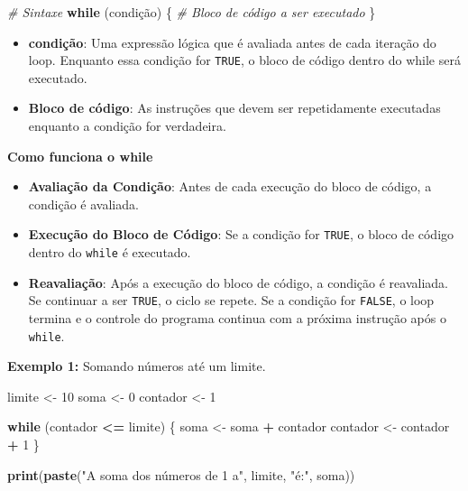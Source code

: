 \documentclass[
]{book}
\newenvironment{Shaded}{\begin{snugshade}}{\end{snugshade}}
\newcommand{\CommentTok}[1]{\textcolor[rgb]{0.56,0.35,0.01}{\textit{#1}}}
\newcommand{\ControlFlowTok}[1]{\textcolor[rgb]{0.13,0.29,0.53}{\textbf{#1}}}
\newcommand{\DecValTok}[1]{\textcolor[rgb]{0.00,0.00,0.81}{#1}}
\newcommand{\FunctionTok}[1]{\textcolor[rgb]{0.13,0.29,0.53}{\textbf{#1}}}
\newcommand{\NormalTok}[1]{#1}
\newcommand{\OtherTok}[1]{\textcolor[rgb]{0.56,0.35,0.01}{#1}}
\newcommand{\SpecialCharTok}[1]{\textcolor[rgb]{0.81,0.36,0.00}{\textbf{#1}}}
\newcommand{\StringTok}[1]{\textcolor[rgb]{0.31,0.60,0.02}{#1}}
\begin{document}
\begin{Shaded}
\begin{Highlighting}[]
\CommentTok{\# Sintaxe}
\ControlFlowTok{while}\NormalTok{ (condição) \{}
  \CommentTok{\# Bloco de código a ser executado}
\NormalTok{\}}
\end{Highlighting}
\end{Shaded}

\begin{itemize}
\item
  \textbf{condição}: Uma expressão lógica que é avaliada antes de cada iteração do loop. Enquanto essa condição for \texttt{TRUE}, o bloco de código dentro do while será executado.
\item
  \textbf{Bloco de código}: As instruções que devem ser repetidamente executadas enquanto a condição for verdadeira.
\end{itemize}

\textbf{Como funciona o while}

\begin{itemize}
\item
  \textbf{Avaliação da Condição}: Antes de cada execução do bloco de código, a condição é avaliada.
\item
  \textbf{Execução do Bloco de Código}: Se a condição for \texttt{TRUE}, o bloco de código dentro do \texttt{while} é executado.
\item
  \textbf{Reavaliação}: Após a execução do bloco de código, a condição é reavaliada. Se continuar a ser \texttt{TRUE}, o ciclo se repete. Se a condição for \texttt{FALSE}, o loop termina e o controle do programa continua com a próxima instrução após o \texttt{while}.
\end{itemize}

\textbf{Exemplo 1:} Somando números até um limite.

\begin{Shaded}
\begin{Highlighting}[]
\NormalTok{limite }\OtherTok{\textless{}{-}} \DecValTok{10}
\NormalTok{soma }\OtherTok{\textless{}{-}} \DecValTok{0}
\NormalTok{contador }\OtherTok{\textless{}{-}} \DecValTok{1}

\ControlFlowTok{while}\NormalTok{ (contador }\SpecialCharTok{\textless{}=}\NormalTok{ limite) \{}
\NormalTok{  soma }\OtherTok{\textless{}{-}}\NormalTok{ soma }\SpecialCharTok{+}\NormalTok{ contador}
\NormalTok{  contador }\OtherTok{\textless{}{-}}\NormalTok{ contador }\SpecialCharTok{+} \DecValTok{1}
\NormalTok{\}}

\FunctionTok{print}\NormalTok{(}\FunctionTok{paste}\NormalTok{(}\StringTok{"A soma dos números de 1 a"}\NormalTok{, limite, }\StringTok{"é:"}\NormalTok{, soma))}
\end{Highlighting}
\end{Shaded}
\end{document}
